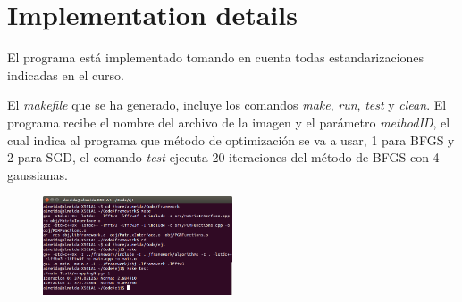 \documentclass[10pt,journal,compsoc]{styles/IEEEtran}
\begin{document}
\appendix
\section{Implementation details}
El programa est\'a implementado tomando en cuenta todas estandarizaciones indicadas en el curso.

El \textit{makefile} que se ha generado, incluye los comandos \textit{make}, \textit{run}, \textit{test} y \textit{clean}. El programa recibe el nombre del archivo de la imagen y el parámetro \textit{methodID}, el cual indica al programa que método de optimización se va a usar, 1 para BFGS y 2 para SGD, el comando \textit{test} ejecuta 20 iteraciones del método de BFGS con 4 gaussianas.\\

\begin{figure}[H]
\centering
\includegraphics[width=0.5\textwidth]{screen.png}
\caption*{}
\end{figure}
\end{document}
